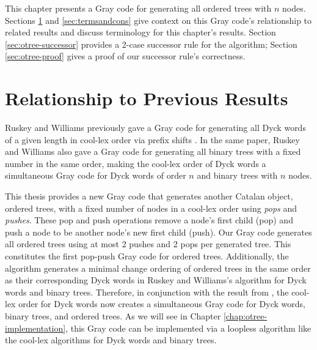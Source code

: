 This chapter presents a Gray code for generating all ordered trees with $n$ nodes. 
Sections \ref{sec:otree-otherresults} and \ref{sec:termsandcons} give context on this Gray code's relationship to related results and discuss terminology for this chapter's results. Section \ref{sec:otree-successor} provides a 2-case successor rule for the algorithm; Section \ref{sec:otree-proof} gives a proof of our successor rule's correctness.


\section{Relationship to Previous Results} \label{sec:otree-otherresults}
Ruskey and Williams previously gave a Gray code for generating all Dyck words of a given length in cool-lex order via prefix shifts \cite{ruskey2008generating}.  In the same paper, Ruskey and Williams also gave a Gray code for generating all binary trees with a fixed number in the same order, making the cool-lex order of Dyck words a simultaneous Gray code for Dyck words of order $n$ and binary trees with $n$ nodes.

This thesis provides a new Gray code that generates another Catalan object, ordered trees, with a fixed number of nodes in a cool-lex order using \emph{pops} and \emph{pushes}.  These pop and push operations remove a node's first child (pop) and push a node to be another node's new first child (push).  Our Gray code generates all ordered trees using at most 2 pushes and 2 pops per generated tree. This constitutes the first pop-push Gray code for ordered trees.  Additionally, the algorithm generates a minimal change ordering of ordered trees in the same order as their corresponding Dyck words in Ruskey and Williams's algorithm for Dyck words and binary trees. Therefore, in conjunction with the result from \cite{ruskey2008generating}, the cool-lex order for Dyck words now creates a simultaneous Gray code for Dyck words, binary trees, and ordered trees.  As we will see in Chapter \ref{chap:otree-implementation}, this Gray code can be implemented via a loopless algorithm like the cool-lex algorithms for Dyck words and binary trees. 


